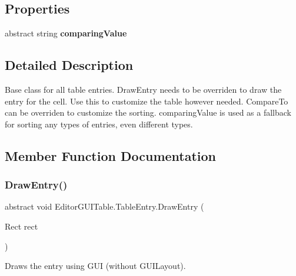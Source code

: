 \subsection*{Properties}
\begin{DoxyCompactItemize}
\item 
\mbox{\label{class_editor_g_u_i_table_1_1_table_entry_a512ab46a9b994edfcf3a9d43a7496516}} 
abstract string {\bfseries comparing\+Value}
\end{DoxyCompactItemize}


\subsection{Detailed Description}
Base class for all table entries. Draw\+Entry needs to be overriden to draw the entry for the cell. Use this to customize the table however needed. Compare\+To can be overriden to customize the sorting. comparing\+Value is used as a fallback for sorting any types of entries, even different types. 



\subsection{Member Function Documentation}
\mbox{\label{class_editor_g_u_i_table_1_1_table_entry_ae02e641122da6dd161d61a20576812ca}} 
\subsubsection{\texorpdfstring{Draw\+Entry()}{DrawEntry()}}
{\footnotesize\ttfamily abstract void Editor\+G\+U\+I\+Table.\+Table\+Entry.\+Draw\+Entry (\begin{DoxyParamCaption}\item[{Rect}]{rect }\end{DoxyParamCaption})\hspace{0.3cm}{\ttfamily [pure virtual]}}



Draws the entry using G\+UI (without G\+U\+I\+Layout). 


